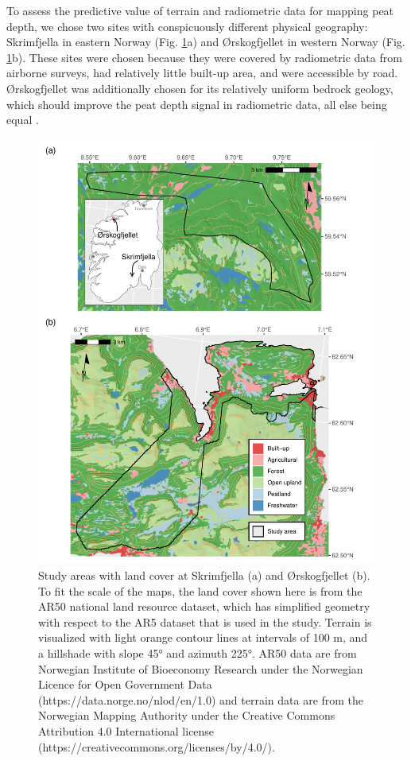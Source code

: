 \documentclass[soil, manuscript]{copernicus}
\begin{document}
To assess the predictive value of terrain and radiometric data for mapping peat depth, we chose two sites with conspicuously different physical geography: Skrimfjella in eastern Norway (Fig. \ref{fig:map-sites}a) and Ørskogfjellet in western Norway (Fig. \ref{fig:map-sites}b).
These sites were chosen because they were covered by radiometric data from airborne surveys, had relatively little built-up area, and were accessible by road.\\
Ørskogfjellet was additionally chosen for its relatively uniform bedrock geology, which should improve the peat depth signal in radiometric data, all else being equal \citep{minasnyDigitalMappingPeatlands2019}.

\begin{figure}
\includegraphics[height=0.81\textheight]{figures/map-sites} \caption{Study areas with land cover at Skrimfjella (a) and Ørskogfjellet (b). To fit the scale of the maps, the land cover shown here is from the AR50 national land resource dataset, which has simplified geometry with respect to the AR5 dataset that is used in the study. Terrain is visualized with light orange contour lines at intervals of 100 m, and a hillshade with slope 45° and azimuth 225°. AR50 data are from Norwegian Institute of Bioeconomy Research under the Norwegian Licence for Open Government Data (https://data.norge.no/nlod/en/1.0) and terrain data are from the Norwegian Mapping Authority under the Creative Commons Attribution 4.0 International license (https://creativecommons.org/licenses/by/4.0/).}\label{fig:map-sites}
\end{figure}
\end{document}
